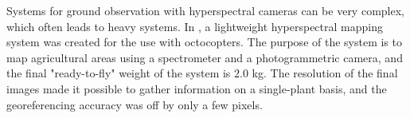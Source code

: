 Systems for ground observation with hyperspectral cameras can be very complex, which often leads to heavy systems. In \cite{hymsySUOMALAINEN}, a lightweight hyperspectral mapping system was created for the use with octocopters. The purpose of the system is to map agricultural areas using a spectrometer and a photogrammetric camera, and the final "ready-to-fly" weight of the system is $2.0$ kg. The resolution of the final images made it possible to gather information on a single-plant basis, and the georeferencing accuracy was off by only a few pixels.

